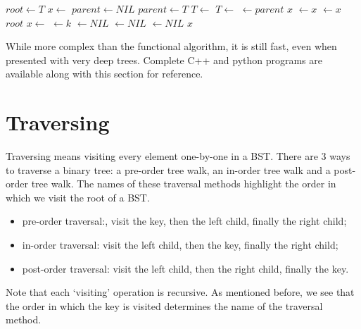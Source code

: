 \documentclass{article}
\begin{document}
\begin{algorithmic}[1]
  \State $root \gets T$
  \State $x \gets$ 
  \State $parent \gets NIL$
    \State $parent \gets T$
      \State $T \gets $ 
    \Else
      \State $T \gets $ 
    \EndIf
  \EndWhile
  \State {} $\gets parent$
   
    \State \Return $x$
    \State {} $\gets x$
  \Else
    \State {} $\gets x$
  \EndIf
  \State \Return $root$
\EndFunction
\Statex
{}
  \State $x \gets $ 
  \State {} $ \gets k$
  \State {} $ \gets NIL$
  \State {} $ \gets NIL$
  \State {} $ \gets NIL$
  \State \Return $x$
\EndFunction
\end{algorithmic}

While more complex than the functional algorithm, it is still fast, even when presented with very deep trees.
Complete C++ and python programs are available along with this section for reference.

\section{Traversing}

Traversing means visiting every element one-by-one in a BST. There are 3 ways to traverse a binary tree: a
pre-order tree walk, an in-order tree walk and a post-order tree walk. The names of these traversal methods
highlight the order in which we visit the root of a BST.

\begin{itemize}
\item pre-order traversal:, visit the key, then the left child, finally the right child;
\item in-order traversal: visit the left child, then the key, finally the right child;
\item post-order traversal: visit the left child, then the right child, finally the key.
\end{itemize}

  

Note that each `visiting' operation is recursive. As mentioned before, we see that the order in which
the key is visited determines the name of the traversal method.
\end{document}
